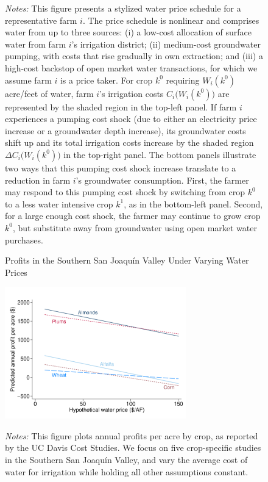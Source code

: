 \documentclass[hidelinks,12pt]{article}
\begin{document}
\begin{figure}[t]
\begin{centering}
\caption*{\footnotesize \emph{Notes:} This figure presents a stylized water price schedule for a representative farm $i$. The price schedule is nonlinear and comprises water from up to three sources: (i) a low-cost allocation of surface water from farm $i$'s irrigation district; (ii) medium-cost groundwater pumping, with costs that rise gradually in own extraction; and (iii) a high-cost backstop of open market water transactions, for which we assume farm $i$ is a price taker. For crop $k^0$ requiring $W_i(k^0)$ acre/feet of water, farm $i$'s irrigation costs $C_i\big(W_i(k^0)\big)$ are represented by the shaded region in the top-left panel. If farm $i$ experiences a pumping cost shock (due to either an electricity price increase or a groundwater depth increase), its groundwater costs shift up and its total irrigation costs increase by the shaded region $\Delta C_i\big(W_i(k^0)\big)$ in the top-right panel. The bottom panels illustrate two ways that this pumping cost shock increase translate to a reduction in farm $i$'s groundwater consumption. First, the farmer may respond to this pumping cost shock by switching from crop $k^0$ to a less water intensive crop $k^1$, as in the bottom-left panel. Second, for a large enough cost shock, the farmer may continue to grow crop $k^0$, but substitute away from groundwater using open market water purchases.
}
\end{centering}
\end{figure}


\begin{figure}[t]
\begin{centering}
\caption{Profits in the Southern San Joaqu\'{i}n Valley Under Varying Water Prices}
\label{fig:davis_line_crossing}
\includegraphics[width=0.7\textwidth]{Figures/davis_lines_crossing.pdf}
\caption*{\footnotesize \emph{Notes:} This figure plots annual profits per acre by crop, as reported by the UC Davis Cost Studies. We focus on five crop-specific studies in the Southern San Joaqu\'{i}n Valley, and vary the average cost of water for irrigation while holding all other assumptions constant.}
\end{centering}
\end{figure}
\end{document}
